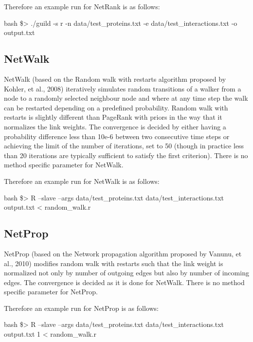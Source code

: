 \documentclass[11pt,twoside]{article}
\newcommand{\printcommand}[1]{\colorbox{code}{\scriptsize{\BUseVerbatim{#1}}}}
\begin{document}
Therefore an example run for NetRank is as follows:

\begin{SaveVerbatim}{bash}
\$> ./guild -s r -n data/test_proteins.txt -e data/test_interactions.txt -o output.txt
\end{SaveVerbatim}
\printcommand{bash}

\subsection{NetWalk}
NetWalk (based on the Random walk with restarts algorithm proposed by Kohler, 
et al., 2008) iteratively simulates random transitions of a walker from a node 
to a randomly selected neighbour node and where at any time step the walk can 
be restarted depending on a predefined probability. Random walk with restarts 
is slightly different than PageRank with priors in the way that it normalizes 
the link weights. The convergence is decided by either having a probability 
difference less than 10e-6 between two consecutive time steps or achieving the 
limit of the number of iterations, set to 50 (though in practice less than 20 
iterations are typically sufficient to satisfy the first criterion). There is 
no method specific parameter for NetWalk.

\vspace{5 mm}
Therefore an example run for NetWalk is as follows:

\begin{SaveVerbatim}{bash}
\$> R --slave --args data/test_proteins.txt data/test_interactions.txt output.txt < random_walk.r
\end{SaveVerbatim}
\printcommand{bash}

\subsection{NetProp}
NetProp (based on the Network propagation algorithm proposed by Vanunu, et al., 
2010) modifies random walk with restarts such that the link weight is 
normalized not only by number of outgoing edges but also by number of incoming 
edges. The convergence is decided as it is done for NetWalk. There is no 
method specific parameter for NetProp.

\vspace{5 mm}
Therefore an example run for NetProp is as follows:

\begin{SaveVerbatim}{bash}
\$> R --slave --args data/test_proteins.txt data/test_interactions.txt output.txt 1 < random_walk.r
\end{SaveVerbatim}
\printcommand{bash}
\end{document}
